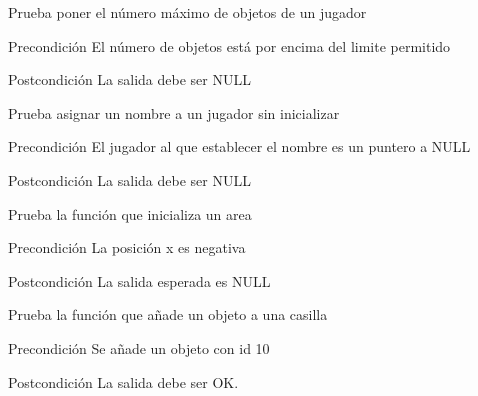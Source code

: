 \begin{DoxyRefList}
\item[\label{test__test000230}%
\hypertarget{test__test000230}{}%
Global \hyperlink{player__test_8c_ae1ed9bdcf1037c295a64cc780cb81dbc}{test2\-\_\-player\-\_\-set\-\_\-max\-\_\-objects} ()]Prueba poner el número máximo de objetos de un jugador \begin{DoxyPrecond}{Precondición}
El número de objetos está por encima del limite permitido 
\end{DoxyPrecond}
\begin{DoxyPostcond}{Postcondición}
La salida debe ser N\-U\-L\-L  
\end{DoxyPostcond}

\item[\label{test__test000205}%
\hypertarget{test__test000205}{}%
Global \hyperlink{player__test_8c_a6e7ce8ff791f4bf63749df647a44263f}{test2\-\_\-player\-\_\-set\-\_\-name} ()]Prueba asignar un nombre a un jugador sin inicializar \begin{DoxyPrecond}{Precondición}
El jugador al que establecer el nombre es un puntero a N\-U\-L\-L 
\end{DoxyPrecond}
\begin{DoxyPostcond}{Postcondición}
La salida debe ser N\-U\-L\-L  
\end{DoxyPostcond}

\item[\label{test__test000235}%
\hypertarget{test__test000235}{}%
Global \hyperlink{screen__test_8c_a6c8401f1a79ed907d35260b89328c7b1}{test2\-\_\-screen\-\_\-area\-\_\-init} ()]Prueba la función que inicializa un area \begin{DoxyPrecond}{Precondición}
La posición x es negativa 
\end{DoxyPrecond}
\begin{DoxyPostcond}{Postcondición}
La salida esperada es N\-U\-L\-L  
\end{DoxyPostcond}

\item[\label{test__test000305}%
\hypertarget{test__test000305}{}%
Global \hyperlink{space__test_8c_af5de291847d272d79a524c30b96f6f0c}{test2\-\_\-space\-\_\-add\-\_\-object} ()]Prueba la función que añade un objeto a una casilla \begin{DoxyPrecond}{Precondición}
Se añade un objeto con id 10 
\end{DoxyPrecond}
\begin{DoxyPostcond}{Postcondición}
La salida debe ser O\-K.  
\end{DoxyPostcond}


\end{DoxyRefList}
